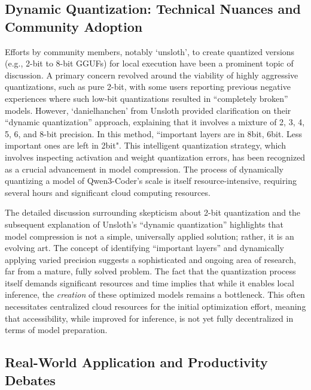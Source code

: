 \subsection{Dynamic Quantization: Technical Nuances and Community Adoption}

Efforts by community members, notably `unsloth', to create quantized versions (e.g., 2-bit to 8-bit GGUFs) for local execution have been a prominent topic of discussion.\cite{hackernews_qwen3coder_2025, unsloth_qwen3coder_local_2025} A primary concern revolved around the viability of highly aggressive quantizations, such as pure 2-bit, with some users reporting previous negative experiences where such low-bit quantizations resulted in ``completely broken'' models. However, `danielhanchen' from Unsloth provided clarification on their ``dynamic quantization'' approach, explaining that it involves a mixture of 2, 3, 4, 5, 6, and 8-bit precision. In this method, ``important layers are in 8bit, 6bit. Less important ones are left in 2bit".\cite{hackernews_qwen3coder_2025} This intelligent quantization strategy, which involves inspecting activation and weight quantization errors, has been recognized as a crucial advancement in model compression.\cite{hackernews_qwen3coder_2025} The process of dynamically quantizing a model of Qwen3-Coder's scale is itself resource-intensive, requiring several hours and significant cloud computing resources.\cite{hackernews_qwen3coder_2025}

The detailed discussion surrounding skepticism about 2-bit quantization and the subsequent explanation of Unsloth's ``dynamic quantization'' highlights that model compression is not a simple, universally applied solution; rather, it is an evolving art. The concept of identifying ``important layers'' and dynamically applying varied precision suggests a sophisticated and ongoing area of research, far from a mature, fully solved problem. The fact that the quantization process itself demands significant resources and time implies that while it enables local inference, the \textit{creation} of these optimized models remains a bottleneck. This often necessitates centralized cloud resources for the initial optimization effort, meaning that accessibility, while improved for inference, is not yet fully decentralized in terms of model preparation.

\subsection{Real-World Application and Productivity Debates}

